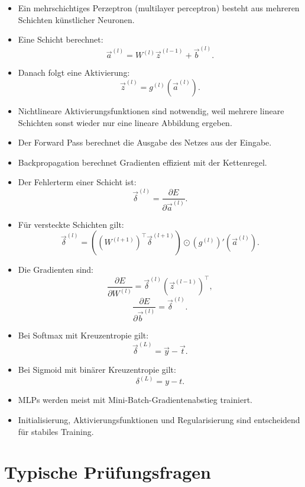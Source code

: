 \begin{itemize}
    \item Ein mehrschichtiges Perzeptron (multilayer perceptron) besteht aus mehreren Schichten künstlicher Neuronen.
    \item Eine Schicht berechnet:
    \[
        \vec{a}^{(l)}
        =
        W^{(l)}\vec{z}^{(l-1)}
        +
        \vec{b}^{(l)}.
    \]
    \item Danach folgt eine Aktivierung:
    \[
        \vec{z}^{(l)}
        =
        g^{(l)}(\vec{a}^{(l)}).
    \]
    \item Nichtlineare Aktivierungsfunktionen sind notwendig, weil mehrere lineare Schichten sonst wieder nur eine lineare Abbildung ergeben.
    \item Der Forward Pass berechnet die Ausgabe des Netzes aus der Eingabe.
    \item Backpropagation berechnet Gradienten effizient mit der Kettenregel.
    \item Der Fehlerterm einer Schicht ist:
    \[
        \vec{\delta}^{(l)}
        =
        \frac{\partial E}{\partial \vec{a}^{(l)}}.
    \]
    \item Für versteckte Schichten gilt:
    \[
        \vec{\delta}^{(l)}
        =
        \left(
            (W^{(l+1)})^{\top}
            \vec{\delta}^{(l+1)}
        \right)
        \odot
        (g^{(l)})'(\vec{a}^{(l)}).
    \]
    \item Die Gradienten sind:
    \[
        \frac{\partial E}{\partial W^{(l)}}
        =
        \vec{\delta}^{(l)}
        (\vec{z}^{(l-1)})^{\top},
    \]
    \[
        \frac{\partial E}{\partial \vec{b}^{(l)}}
        =
        \vec{\delta}^{(l)}.
    \]
    \item Bei Softmax mit Kreuzentropie gilt:
    \[
        \vec{\delta}^{(L)}
        =
        \vec{y}-\vec{t}.
    \]
    \item Bei Sigmoid mit binärer Kreuzentropie gilt:
    \[
        \delta^{(L)}
        =
        y-t.
    \]
    \item MLPs werden meist mit Mini-Batch-Gradientenabstieg trainiert.
    \item Initialisierung, Aktivierungsfunktionen und Regularisierung sind entscheidend für stabiles Training.
\end{itemize}

\section{Typische Prüfungsfragen}

